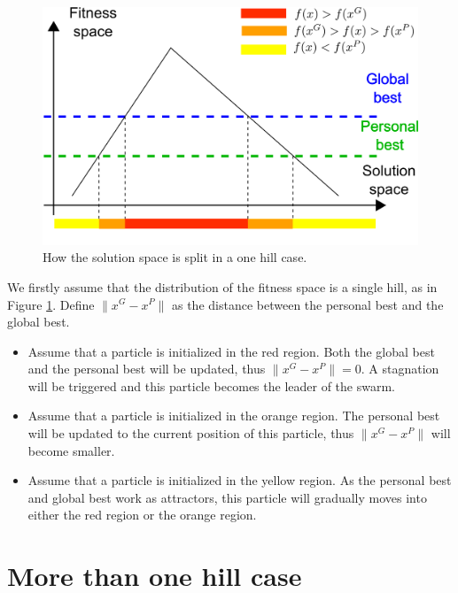 \begin{figure}
\centering
\includegraphics[width=0.7\linewidth]{./one_hill_case_region_split}
\caption{How the solution space is split in a one hill case.}
\label{fig:one_hill_case_split_region}
\end{figure}

We firstly assume that the distribution of the fitness space is a single hill, as in Figure \ref{fig:one_hill_case_split_region}.
Define $ \lVert x^{G} - x^{P} \rVert $ as the distance between the personal best and the global best.
\begin{itemize}
\item Assume that a particle is initialized in the red region.
Both the global best and the personal best will be updated, thus $ \lVert x^{G} - x^{P} \rVert = 0 $.
A stagnation will be triggered and this particle becomes the leader of the swarm.
\item Assume that a particle is initialized in the orange region.
The personal best will be updated to the current position of this particle, thus $ \lVert x^{G} - x^{P} \rVert $ will become smaller. 
\item Assume that a particle is initialized in the yellow region.
As the personal best and global best work as attractors, this particle will gradually moves into either the red region or the orange region.
\end{itemize}

\section{More than one hill case}
\label{sec:more_than_one_hill_case}



